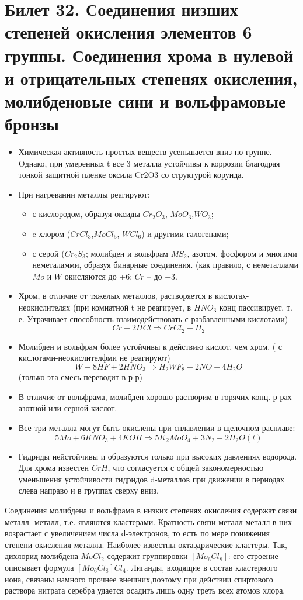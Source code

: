 \documentclass[11pt]{article}
\begin{document}
\section{Билет 32. Соединения низших степеней окисления элементов 6 группы. Соединения хрома в нулевой и отрицательных степенях окисления, молибденовые сини и вольфрамовые бронзы}
\begin{itemize}
\item Химическая активность простых веществ усеньшается вниз по группе. Oднако, при умеренных t все 3 металла устойчивы к коррозии благодрая тонкой защитной пленке оксила Cr2O3 со структурой корунда. 
    \item При нагревании металлы реагируют: 
    \begin{itemize}
    \item с кислородом, образуя оксиды $Cr_2O_3$, $MoO_3$,$WO_3$;
    \item c хлором ($CrCl_3$,$MoCl_5$, $WCl_6$) и другими галогенами; 
    \item с серой ($Cr_2S_3$; молибден и вольфрам $MS_2$, азотом, фосфором и многими неметаламми, образуя бинарные соединения. (как правило, с неметаллами $Mo$ и $W$ окисляются до +6; $Cr$ – до +3. 
    \end{itemize}
    \item Хром, в отличие от тяжелых металлов, растворяется в кислотах-неокислителях (при комнатной t не реагирует, в $HNO_3$ конц пассивирует, т. е. Утрачивает способность взаимодействовать с разбавленными кислотами)
$$Cr + 2HCl \Rightarrow CrCl_2 + H_2$$
    \item Молибден и вольфрам более устойчивы к действию кислот, чем хром. ( с кислотами-неокислителфми не реагируют)
$$W+8HF+2HNO_3 \Rightarrow H_2WF_8 +2NO+4H_2O$$
 (только эта смесь переводит в р-р)
    \item В отличие от вольфрама, молибден хорошо растворим в горячих конц. р-рах азотной или серной кислот.
    \item Все три металла могут быть окислены при сплавлении в щелочном расплаве: $$5Mo + 6KNO_3 + 4KOH \Rightarrow 5K_2MoO_4 + 3N_2 + 2H_2O  (t)$$
    \item Гидриды нейстойчивы и образуются только при высоких давлениях водорода. Для хрома известен $CrH$, что согласуется с общей закономерностью уменьшения устойчивости гидридов d-металлов при движении в периодах слева направо и в группах сверху вниз. 
\end{itemize}

Соединения молибдена и вольфрама в низких степенях окисления содержат связи металл -металл, т.е. являются кластерами. Кратность связи металл-металл в них возрастает с увеличением числа d-электронов, то есть по мере понижения степени окисления металла.  Hаиболее известны октаэдрические кластеры. Так, дихлорид молибдена $MoCl_2$ содержит группировки $[Mo_6Cl_8]$: его строение описывает формула $[Mo_6Cl_8]Cl_4$. Лиганды, входящие в состав кластерного иона, связаны намного  прочнее внешних,поэтому при действии спиртового раствора нитрата серебра удается осадить лишь одну треть всех атомов хлора. 
\end{document}
